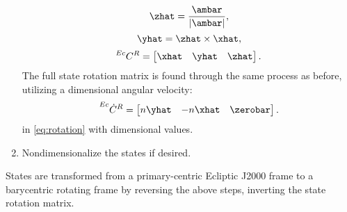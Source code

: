 \begin{enumerate}
            \begin{equation}
                \zhat=\frac{\ambar}{|\ambar|},
                \label{eq:zhat}
            \end{equation}
            \vspace{1mm}
            \begin{equation}
                \yhat=\zhat\times\xhat,
                \label{eq:yhat}
            \end{equation}
            \vspace{1mm}
            \begin{equation}
                \prescript{Ec}{}{C}^{R}=\begin{bmatrix} \xhat   &   \yhat   &   \zhat   \end{bmatrix}.
                \label{eq:eclipticpositionrotation}
            \end{equation}
            The full state rotation matrix is found through the same process as before, utilizing a
            dimensional angular velocity:
            \begin{equation}
                \prescript{Ec}{}{\dot{C}}^{R}=\begin{bmatrix}   n\yhat  &   -n\xhat &   \zerobar    \end{bmatrix}.
                \label{eq:eclipticvelocityrotation}
            \end{equation}
            in \cref{eq:rotation} with dimensional values.
    \item   Nondimensionalize the states if desired.
\end{enumerate}
States are transformed from a primary-centric Ecliptic J2000 frame to a barycentric rotating frame
by reversing the above steps, inverting the state rotation matrix.
